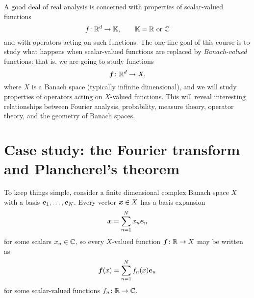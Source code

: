 A good deal of real analysis is concerned with properties of scalar-valued functions
\begin{equation*}
  f \colon \mathbb{R}^{d} \rightarrow \mathbb{K}, \qquad \mathbb{K} = \text{$\mathbb{R}$ or $\mathbb{C}$}
\end{equation*}
and with operators acting on such functions.
The one-line goal of this course is to study what happens when scalar-valued functions are replaced by \emph{Banach-valued} functions: that is, we are going to study functions
\begin{equation*}
  \bm{f} \colon \mathbb{R}^{d} \rightarrow X,
\end{equation*}
where $X$ is a Banach space (typically infinite dimensional), and we will study properties of operators acting on $X$-valued functions.
This will reveal interesting relationships between Fourier analysis, probability, measure theory, operator theory, and the geometry of Banach spaces.

\section{Case study: the Fourier transform and Plancherel's theorem}

To keep things simple, consider a finite dimensional complex Banach space $X$ with a basis $\bm{e}_{1}, \ldots, \bm{e}_{N}$.
Every vector $\bm{x} \in X$ has a basis expansion
\begin{equation*}
  \bm{x} = \sum_{n=1}^{N} x_{n} \bm{e}_{n}
\end{equation*}
for some scalars $x_{n} \in \mathbb{C}$, so every $X$-valued function $\bm{f} \colon \mathbb{R} \rightarrow X$ may be written as
\begin{equation*}
  \bm{f}(x) = \sum_{n=1}^{N} f_{n}(x) \bm{e}_{n}
\end{equation*}
for some scalar-valued functions $f_{n} \colon \mathbb{R} \rightarrow \mathbb{C}$.

